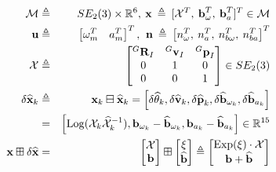 \vspace{-4mm}\small
\begin{eqnarray}
\label{eq:state}
	\mathcal{M} &\triangleq& SE_{2}(3) \times \mathbb{R}^{6}, \:   
	    \textbf{x} \: \triangleq \: [\mathcal{X}^T, \: \textbf{b}_{\omega}^T, \: \textbf{b}_a^T ]^T \in\mathcal{M} \nonumber  \\
	\textbf{u} &\triangleq& \left[\omega_m^T \quad  a_m^T \right]^T,\, \: \textbf{n} \: \triangleq \: \left[n_\omega^T, \: n_a^T, \: n_{b\omega}^T, \: n_{ba}^T  \right]^T \\
    \label{eq:SE2(3) define}
    \mathcal{X}  &\triangleq& \begin{bmatrix}
    {}^G\textbf{R}_{I} & {}^G\textbf{v}_{I} & {}^G\textbf{p}_{I} \\
     0 & 1 & 0 \\
     0 & 0 & 1 \\
    \end{bmatrix}\in SE_2(3) \nonumber  \\
     \delta \widehat{\textbf{x}}_{k}&\triangleq&\textbf{x}_{k} \boxminus \widehat{\textbf{x}}_{k} = \left [ \delta \widehat{\theta}_{k}, \delta \widehat{\textbf{v}}_{k},\delta \widehat{\textbf{p}}_{k},\delta \widehat{\textbf{b}}_{\omega_{k}},\delta \widehat{\textbf{b}}_{a_k} \right ]  \nonumber\\
     &=& \left [\mathrm{Log}( \mathcal{X}_k\widehat{\mathcal{X}}_k^{-1}), {\textbf{b}}_{\omega_{k}}-\widehat{\textbf{b}}_{\omega_{k}}, {\textbf{b}}_{a_k}- \widehat{\textbf{b}}_{a_k} \right ] \in \mathbb{R}^{15}
     \nonumber \\
     \textbf{x} \boxplus \delta \widehat{\textbf{x}} &=& \begin{bmatrix}\mathcal {X} \\ \mathbf {b} \end{bmatrix} \boxplus \begin{bmatrix} {\xi } \\ \widehat{\mathbf {b}} \end{bmatrix} \triangleq \begin{bmatrix}\rm Exp({\xi }) \cdot \mathcal {X} \\ \mathbf {b} + \widehat{\mathbf {b}} \end{bmatrix} \nonumber
     \vspace{-8mm}
\end{eqnarray}
